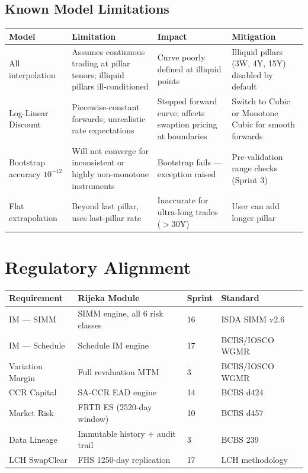 \documentclass[11pt, a4paper]{article}
\begin{document}
\subsection{Known Model Limitations}

\begin{center}
\begin{tabular}{L{2.5cm} L{4cm} L{2.8cm} L{3.2cm}}
\toprule
\textbf{Model} & \textbf{Limitation} & \textbf{Impact} & \textbf{Mitigation} \\
\midrule
All interpolation & Assumes continuous trading at pillar tenors; illiquid pillars ill-conditioned
& Curve poorly defined at illiquid points
& Illiquid pillars (3W, 4Y, 15Y) disabled by default \\
\addlinespace
Log-Linear Discount & Piecewise-constant forwards; unrealistic rate expectations
& Stepped forward curve; affects swaption pricing at boundaries
& Switch to Cubic or Monotone Cubic for smooth forwards \\
\addlinespace
Bootstrap accuracy $10^{-12}$ & Will not converge for inconsistent or highly non-monotone instruments
& Bootstrap fails — exception raised
& Pre-validation range checks (Sprint 3) \\
\addlinespace
Flat extrapolation & Beyond last pillar, uses last-pillar rate
& Inaccurate for ultra-long trades ($>30$Y)
& User can add longer pillar \\
\bottomrule
\end{tabular}
\end{center}

\section{Regulatory Alignment}

\begin{center}
\begin{tabular}{L{3cm} L{3.5cm} L{1.5cm} L{4.5cm}}
\toprule
\textbf{Requirement} & \textbf{Rijeka Module} & \textbf{Sprint} & \textbf{Standard} \\
\midrule
IM — SIMM     & SIMM engine, all 6 risk classes & 16 & ISDA SIMM v2.6 \\
IM — Schedule & Schedule IM engine              & 17 & BCBS/IOSCO WGMR \\
Variation Margin & Full revaluation MTM          &  3 & BCBS/IOSCO WGMR \\
CCR Capital   & SA-CCR EAD engine               & 14 & BCBS d424 \\
Market Risk   & FRTB ES (2520-day window)        & 10 & BCBS d457 \\
Data Lineage  & Immutable history + audit trail  &  3 & BCBS 239 \\
LCH SwapClear & FHS 1250-day replication         & 17 & LCH methodology \\
\bottomrule
\end{tabular}
\end{center}
\end{document}
